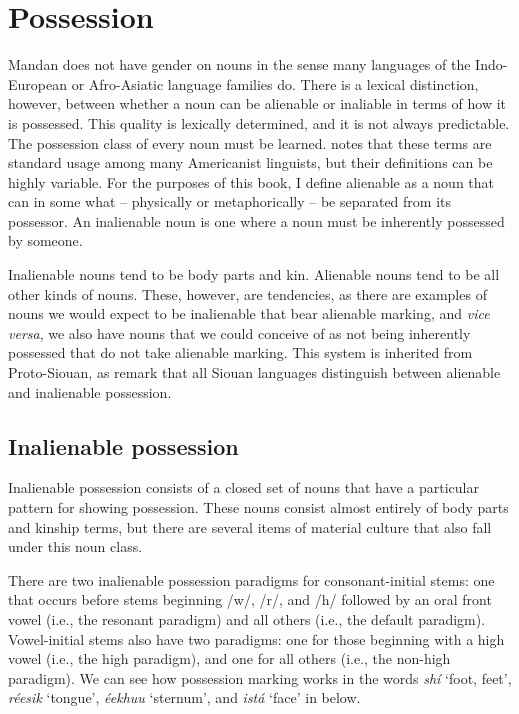 \section{Possession}\label{SecPossession}

Mandan does not have gender on nouns in the sense many languages of the Indo-European or Afro-Asiatic language families do. There is a lexical distinction, however, between whether a noun can be alienable or inaliable in terms of how it is possessed. This quality is lexically determined, and it is not always predictable. The possession class of every noun must be learned. \citet[561]{nichols1988} notes that these terms are standard usage among many Americanist linguists, but their definitions can be highly variable. For the purposes of this book, I define alienable as a noun that can in some what -- physically or metaphorically -- be separated from its possessor. An inalienable noun is one where a noun must be inherently possessed by someone.

Inalienable nouns tend to be body parts and kin. Alienable nouns tend to be all other kinds of nouns. These, however, are tendencies, as there are examples of nouns we would expect to be inalienable that bear alienable marking, and \textit{vice versa}, we also have nouns that we could conceive of as not being inherently possessed that do not take alienable marking. This system is inherited from Proto-Siouan, as \citet[108]{parksrankin2001} remark that all Siouan languages distinguish between alienable and inalienable possession.

\subsection{Inalienable possession}\label{SubSecInalienable}

Inalienable possession consists of a closed set of nouns that have a particular pattern for showing possession. These nouns consist almost entirely of body parts and kinship terms, but there are several items of material culture that also fall under this noun class. 

There are two inalienable possession paradigms for consonant-initial stems: one that occurs before stems beginning /w/, /r/, and /h/ followed by an oral front vowel (i.e., the resonant paradigm) and all others (i.e., the default paradigm). Vowel-initial stems also have two paradigms: one for those beginning with a high vowel (i.e., the high paradigm), and one for all others (i.e., the non-high paradigm). We can see how possession marking works in the words  \textit{shí} `foot, feet', \textit{réesik} `tongue', \textit{éekhuu} `sternum', and \textit{istá} `face' in  below.

